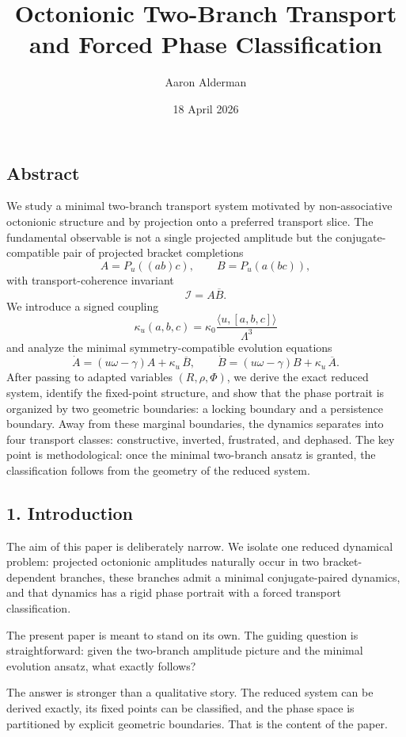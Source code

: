 \documentclass[
]{article}
\title{Octonionic Two-Branch Transport and Forced Phase Classification}
\author{Aaron Alderman}
\date{18 April 2026}
\begin{document}
\maketitle

\subsection{Abstract}\label{abstract}

We study a minimal two-branch transport system motivated by
non-associative octonionic structure and by projection onto a preferred
transport slice. The fundamental observable is not a single projected
amplitude but the conjugate-compatible pair of projected bracket
completions \[
A = P_u((ab)c), \qquad B = P_u(a(bc)),
\] with transport-coherence invariant \[
\mathcal{I} = A \overline{B}.
\] We introduce a signed coupling \[
\kappa_{u}(a,b,c) = \kappa_0 \frac{\langle u,[a,b,c]\rangle}{\Lambda^3}
\] and analyze the minimal symmetry-compatible evolution equations \[
\dot{A} = (u\omega - \gamma)A + \kappa_{u}\,\overline{B}, \qquad
\dot{B} = (u\omega - \gamma)B + \kappa_{u}\,\overline{A}.
\] After passing to adapted variables \((R,\rho,\Phi)\), we derive the
exact reduced system, identify the fixed-point structure, and show that
the phase portrait is organized by two geometric boundaries: a locking
boundary and a persistence boundary. Away from these marginal
boundaries, the dynamics separates into four transport classes:
constructive, inverted, frustrated, and dephased. The key point is
methodological: once the minimal two-branch ansatz is granted, the
classification follows from the geometry of the reduced system.

\subsection{1. Introduction}\label{introduction}

The aim of this paper is deliberately narrow. We isolate one reduced
dynamical problem: projected octonionic amplitudes naturally occur in
two bracket-dependent branches, these branches admit a minimal
conjugate-paired dynamics, and that dynamics has a rigid phase portrait
with a forced transport classification.

The present paper is meant to stand on its own. The guiding question is
straightforward: given the two-branch amplitude picture and the minimal
evolution ansatz, what exactly follows?

The answer is stronger than a qualitative story. The reduced system can
be derived exactly, its fixed points can be classified, and the phase
space is partitioned by explicit geometric boundaries. That is the
content of the paper.
\end{document}
